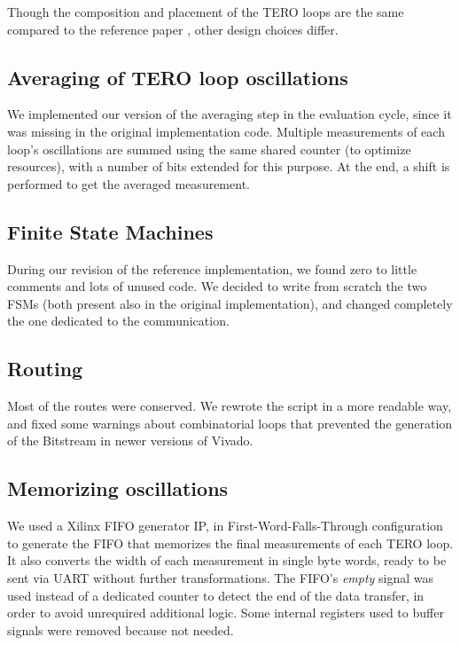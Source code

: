 Though the composition and placement of the TERO loops are the same compared to 
the reference paper \cite{ref_pap}, other design choices differ.

\subsection{Averaging of TERO loop oscillations}
We implemented our version of the averaging step in the evaluation cycle, 
since it was missing in the original implementation code.
Multiple measurements of each loop's oscillations are summed using the same shared counter 
(to optimize resources), with a number of bits extended for this purpose. 
At the end, a shift is performed to get the averaged measurement.

\subsection{Finite State Machines}
During our revision of the reference implementation, we found zero to little comments and 
lots of unused code.
We decided to write from scratch the two FSMs (both present also in the original implementation),
and changed completely the one dedicated to the communication.

\subsection{Routing}
Most of the routes were conserved. We rewrote the script in a more readable way, and fixed some
warnings about combinatorial loops that prevented the generation of the Bitstream 
in newer versions of Vivado.

\subsection{Memorizing oscillations}
We used a Xilinx FIFO generator IP, in First-Word-Falls-Through configuration to generate the FIFO
that memorizes the final measurements of each TERO loop. It also converts the width of each
measurement in single byte words, ready to be sent via UART without further transformations.
The FIFO's \textit{empty} signal was used instead of a dedicated counter to detect the end of the data transfer, in order
to avoid unrequired additional logic. Some internal registers used to buffer signals were removed because not needed.